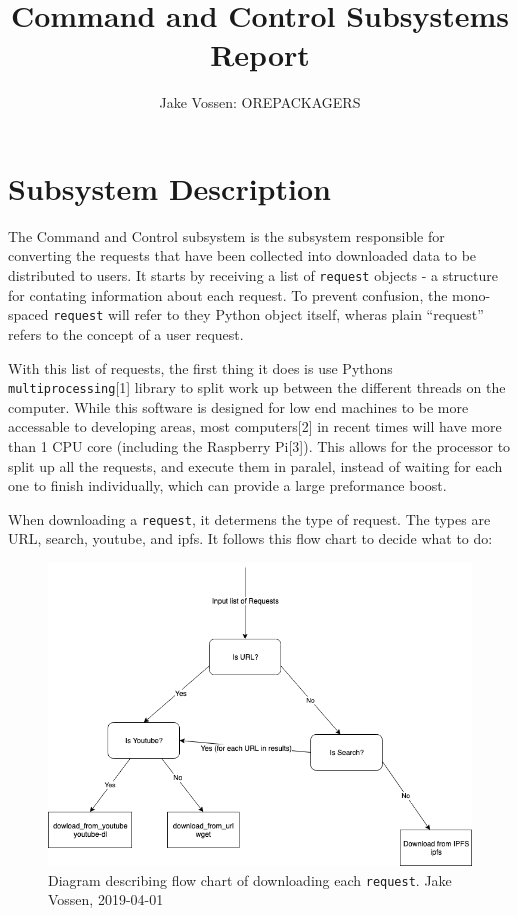 \documentclass{article}
\begin{document}
\title{Command and Control Subsystems Report}
\author{Jake Vossen: OREPACKAGERS}

\maketitle


\section{Subsystem Description}
The Command and Control subsystem is the subsystem responsible for
converting the requests that have been collected into downloaded data
to be distributed to users. It starts by receiving a list of
\texttt{request} objects - a structure for contating information about
each request. To prevent confusion, the mono-spaced \texttt{request}
will refer to they Python object itself, wheras plain ``request''
refers to the concept of a user request.

With this list of requests, the first thing it does is use Pythons
\texttt{multiprocessing}[1] library to split work up between the
different threads on the computer. While this software is designed
for low end machines to be more accessable to developing areas, most
computers[2] in recent times will have more than 1 CPU core (including
the Raspberry Pi[3]). This allows for the processor to split up all
the requests, and execute them in paralel, instead of waiting for each
one to finish individually, which can provide a large preformance
boost.

When downloading a \texttt{request}, it determens the type of
request. The types are URL, search, youtube, and ipfs. It follows this
flow chart to decide what to do:

\begin{figure}[h]
  \centering
  \includegraphics[scale=.6]{log-flow-chart.png}
  \caption{\begingroup \fontsize{10pt}{12pt}\selectfont Diagram describing flow chart of downloading each
    \texttt{request}. Jake Vossen, 2019-04-01 \endgroup}
\end{figure}
\end{document}
